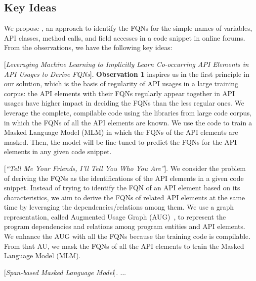 
\subsection{Key Ideas}
\label{sec:key}

We propose {\tool}, an approach to identify the FQNs for the simple
names of variables, API classes, method calls, and field accesses in a
code snippet in online forums. From the observations, we have the
following key ideas:

\vspace{2pt}
 [{\em Leveraging Machine Learning to
    Implicitly Learn Co-occurring API Elements in API Usages to Derive
    FQNs}]. {\bf Observation 1} inspires us in the first principle in
our solution, which is the basis of regularity of API usages in a
large training corpus: the API elements with their FQNs regularly
appear together in API usages have higher impact in deciding the FQNs than
the less regular ones. We leverage the complete, compilable code using
the libraries from large code corpus, in which the FQNs of all the API
elements are known. We use the code to train a Masked Language Model
(MLM) in which the FQNs of the API elements are masked. Then, the
model will be fine-tuned to predict the FQNs for the API elements in
any given code snippet.

\vspace{2pt}
 [{\em ``Tell Me Your Friends, I'll Tell You
    Who You Are''}]. We consider the problem of deriving the FQNs as
the identifications of the API elements in a given code snippet.
Instead of trying to identify the FQN of an API element based on its
characteristics, we aim to derive the FQNs of related API elements at
the same time by leveraging the dependencies/relations among them.  We
use a graph representation, called Augmented Usage Graph
(AUG)~\cite{msr19}, to represent the program dependencies and
relations among program entities and API elements. We enhance the AUG
with all the FQNs because the training code is compilable. From that
AU, we mask the FQNs of all the API elements to train the Masked
Language Model (MLM).

\vspace{2pt}
 [{\em Span-based Masked Language Model}]. ...



